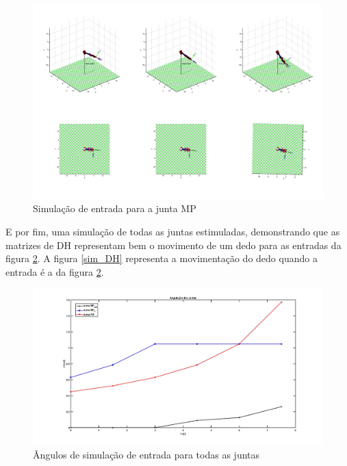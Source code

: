 \begin{figure}[H]
\centering
\includegraphics[width = 1\textwidth]{img/simmp.png}
\caption[Simulação de entrada para a junta MP]{Simulação de entrada para a junta MP}
\label{sim_mp}
\end{figure}

E por fim, uma simulação de todas as juntas estimuladas, demonstrando que as matrizes de DH representam bem o movimento de um dedo para as entradas da figura \ref{ang_sim_DH}. A figura \ref{sim_DH} representa a movimentação do dedo quando a entrada é a da figura \ref{ang_sim_DH}.

\begin{figure}[H]
\centering
\includegraphics[width = 1\textwidth]{img/angulacao_tudo.jpg}
\caption[Ângulos de simulação de entrada para todas as juntas]{Ângulos de simulação de entrada para todas as juntas}
\label{ang_sim_DH}
\end{figure}

